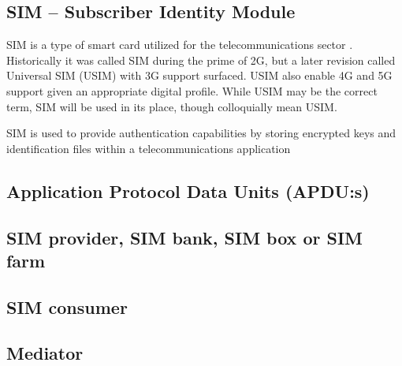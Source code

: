 \subsection{SIM -- Subscriber Identity Module}

SIM is a type of smart card utilized for the telecommunications sector
\cite{sim}. Historically it was called SIM during the prime of 2G,
but a later revision called Universal SIM (USIM) with 3G \cite{usim}
support surfaced. USIM also enable 4G and 5G support given an
appropriate digital profile. While USIM may be the correct term, SIM
will be used in its place, though colloquially mean USIM.

SIM is used to provide authentication capabilities by storing
encrypted keys and identification files within a telecommunications
application \cite{sim-application}

\subsection{Application Protocol Data Units (APDU:s)}

\subsection{SIM provider, SIM bank, SIM box or SIM farm}

\subsection{SIM consumer}

\subsection{Mediator}
